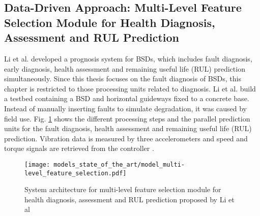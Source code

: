 \subsection{Data-Driven Approach: Multi-Level Feature Selection Module for Health Diagnosis, Assessment and RUL Prediction}
Li et al. \cite{LiPin2018} developed a prognosis system for BSDs, which includes fault diagnosis, early diagnosis, health assessment and remaining useful life (RUL) prediction simultaneously. Since this thesis focuses on the fault diagnosis of BSDs, this chapter is restricted to those processing units related to diagnosis. Li et al. build a testbed containing a BSD and horizontal guideways fixed to a concrete base. Instead of manually inserting faults to simulate degradation, it was caused by field use. Fig.  \ref{fig:level_feature_selection_model} shows the different processing steps and the parallel prediction units for the fault diagnosis, health assessment and remaining useful life (RUL) prediction. Vibration data is measured by three accelerometers and speed and torque signals are retrieved from the controller \cite{LiPin2018}. 

\begin{figure}[H]
  \centering
  \texttt{[image: models\_state\_of\_the\_art/model\_multi-level\_feature\_selection.pdf]}
  \caption{System architecture for multi-level feature selection module for health diagnosis, assessment and RUL prediction proposed by Li et al \cite{LiPin2018}}
  \label{fig:level_feature_selection_model}
\end{figure}

